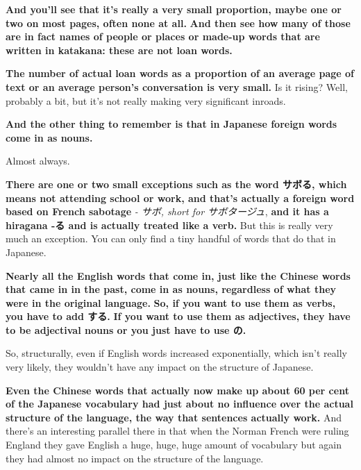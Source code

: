 {}

{\bf And you'll see that it's really a very small proportion, maybe one or two on most pages, often none at all.} {\bf And then see how many of those are in fact names of people or places or made-up words that are written in katakana: these are not loan words.}

{\bf The number of actual loan words as a proportion of an average page of text or an average person's conversation is very small.} Is it rising? Well, probably a bit, but it's not really making very significant inroads.

\thinrule

{\bf And the other thing to remember is that in Japanese foreign words come in as nouns.}

{}

Almost always.

{\bf There are one or two small exceptions such as the word サボる, which means not attending school or work, and that's actually a foreign word based on French sabotage} {\em - サボ, short for サボタージュ}, {\bf and it has a hiragana -る and is actually treated like a verb.} But this is really very much an exception. You can only find a tiny handful of words that do that in Japanese.

\thinrule

{\bf Nearly all the English words that come in, just like the Chinese words that came in in the past, come in as nouns, regardless of what they were in the original language.} {\bf So, if you want to use them as verbs, you have to add する.} {\bf If you want to use them as adjectives, they have to be adjectival nouns or you just have to use の.}

\thinrule

So, structurally, even if English words increased exponentially, which isn't really very likely, they wouldn't have any impact on the structure of Japanese.

{\bf Even the Chinese words that actually now make up about 60 per cent of the Japanese vocabulary had just about no influence over the actual structure of the language, the way that sentences actually work.} And there's an interesting parallel there in that when the Norman French were ruling England they gave English a huge, huge, huge amount of vocabulary but again they had almost no impact on the structure of the language.

\stopsectionlevel

